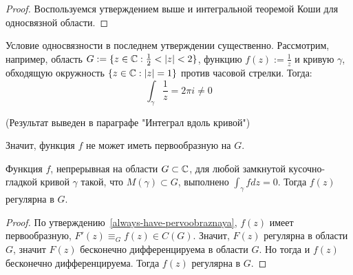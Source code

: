 \begin{proof}
	Воспользуемся утверждением выше и интегральной теоремой Коши для односвязной области.
\end{proof}

\begin{unnecessary}
    \begin{note}
    	Условие односвязности в последнем утверждении существенно. Рассмотрим, например, область $G := \{z \in \mathbb{C}: \frac12 < |z| < 2\}$, функцию $f(z) := \frac1z$ и кривую $\gamma$, обходящую окружность $\{z \in \mathbb{C}: |z| = 1\}$ против часовой стрелки. Тогда:
    	\[\int_\gamma\frac1{z} = 2\pi i \ne 0\]
    
        (Результат выведен в параграфе "Интеграл вдоль кривой")
        
    	Значит, функция $f$ не может иметь первообразную на $G$.
    \end{note}
\end{unnecessary}

\begin{theorem}[Мореры]
	Функция $f$, непрерывная на области $G \subset \mathbb{C}$, для любой замкнутой кусочно-гладкой кривой $\gamma$ такой, что $M(\gamma) \subset G$, выполнено $\int_\gamma fdz = 0$. Тогда $f(z)$ регулярна в $G$.
\end{theorem}

\begin{proof}
	По утверждению~\ref{always-have-pervoobraznaya}, $f(z)$ имеет первообразную, $F'(z) \equiv_G f(z) \in C(G)$. Значит, $F(z)$ регулярна в области $G$, значит $F(z)$ бесконечно дифференцируема в области $G$. Но тогда и $f(z)$ бесконечно дифференцируема. Тогда $f(z)$ регулярна в $G$.
\end{proof}
